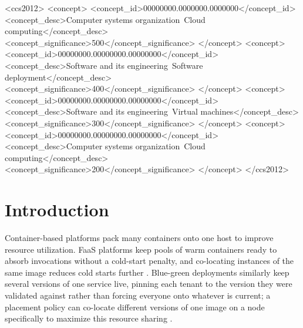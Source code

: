 \documentclass[sigplan,10pt,natbib=false]{acmart}
\begin{document}
\begin{CCSXML}
<ccs2012>
 <concept>
  <concept_id>00000000.0000000.0000000</concept_id>
  <concept_desc>Computer systems organization~Cloud computing</concept_desc>
  <concept_significance>500</concept_significance>
 </concept>
 <concept>
  <concept_id>00000000.00000000.00000000</concept_id>
  <concept_desc>Software and its engineering~Software deployment</concept_desc>
  <concept_significance>400</concept_significance>
 </concept>
 <concept>
  <concept_id>00000000.00000000.00000000</concept_id>
  <concept_desc>Software and its engineering~Virtual machines</concept_desc>
  <concept_significance>300</concept_significance>
 </concept>
 <concept>
  <concept_id>00000000.00000000.00000000</concept_id>
  <concept_desc>Computer systems organization~Cloud computing</concept_desc>
  <concept_significance>200</concept_significance>
 </concept>
</ccs2012>
\end{CCSXML}



\maketitle

\section{Introduction}
\label{sec:intro}

Container-based platforms pack many containers onto one host to
improve resource utilization. FaaS platforms keep pools of warm
containers ready to absorb invocations without a cold-start penalty,
and co-locating instances of the same image reduces cold starts
further \cite{beni_coldstarts}. Blue-green deployments similarly keep
several versions of one service live, pinning each tenant to the
version they were validated against rather than forcing everyone onto
whatever is current; a placement policy can co-locate different
versions of one image on a node specifically to maximize this resource
sharing \cite{truyen2020flexible}.
\end{document}
